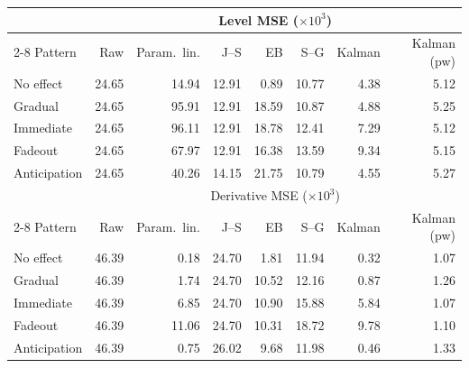 \begin{tabular}{l rrrrrrr}
\toprule
& \multicolumn{7}{c}{Level MSE ($\times 10^3$)} \\
\cmidrule(lr){2-8}
Pattern & Raw & Param.\ lin. & J--S & EB & S--G & Kalman & Kalman (pw) \\
\midrule
No effect       & 24.65 & 14.94 & 12.91 & 0.89 & 10.77 & 4.38 & 5.12 \\
Gradual         & 24.65 & 95.91 & 12.91 & 18.59 & 10.87 & 4.88 & 5.25 \\
Immediate       & 24.65 & 96.11 & 12.91 & 18.78 & 12.41 & 7.29 & 5.12 \\
Fadeout         & 24.65 & 67.97 & 12.91 & 16.38 & 13.59 & 9.34 & 5.15 \\
Anticipation    & 24.65 & 40.26 & 14.15 & 21.75 & 10.79 & 4.55 & 5.27 \\
\midrule
& \multicolumn{7}{c}{Derivative MSE ($\times 10^3$)} \\
\cmidrule(lr){2-8}
Pattern & Raw & Param.\ lin. & J--S & EB & S--G & Kalman & Kalman (pw) \\
\midrule
No effect       & 46.39 & 0.18 & 24.70 & 1.81 & 11.94 & 0.32 & 1.07 \\
Gradual         & 46.39 & 1.74 & 24.70 & 10.52 & 12.16 & 0.87 & 1.26 \\
Immediate       & 46.39 & 6.85 & 24.70 & 10.90 & 15.88 & 5.84 & 1.07 \\
Fadeout         & 46.39 & 11.06 & 24.70 & 10.31 & 18.72 & 9.78 & 1.10 \\
Anticipation    & 46.39 & 0.75 & 26.02 & 9.68 & 11.98 & 0.46 & 1.33 \\
\bottomrule
\end{tabular}
